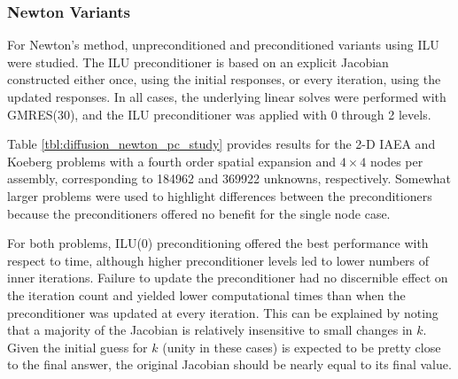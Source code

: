 \subsubsection{Newton Variants}

For Newton's method, unpreconditioned 
and preconditioned variants using ILU were studied.  The ILU preconditioner
is based on an explicit Jacobian constructed either once, using 
the initial responses, or every iteration, using the updated responses.  
In all cases, the underlying linear solves were performed with GMRES(30),
and the ILU preconditioner was applied with 0 through 2 levels.

Table \ref{tbl:diffusion_newton_pc_study} provides results for the 
2-D IAEA and Koeberg problems with a fourth order spatial 
expansion and $4\times 4$ nodes per assembly, corresponding to
184962 and 369922 unknowns, respectively.
Somewhat larger problems were used to highlight differences between
the preconditioners because the preconditioners offered no benefit 
for the single node case.

For both problems, ILU(0) preconditioning offered the best performance
with respect to time, although higher preconditioner levels 
led to lower numbers of inner iterations.
Failure to update the preconditioner had no discernible effect 
on the iteration count and yielded lower computational times than when 
the preconditioner was updated at every iteration.  This can be explained 
by noting that a majority of the Jacobian is relatively insensitive 
to small changes in $k$.  Given the initial guess for $k$ 
(unity in these cases)
is expected to be pretty close to the final answer, the original Jacobian
should be nearly equal to its final value.

